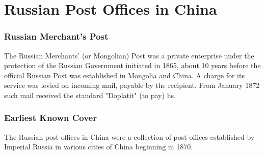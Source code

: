 \chapter{Russian Post Offices in China}  
\subsection{Russian Merchant's Post}

The Russian Merchants' (or Mongolian) Post was a private
enterprise under the protection of the Russian Government initiated
in 1865, about 10 years before the official Russian Post was established
in Mongolia and China. A charge for its service was levied on incoming mail,
payable by the recipient. From January 1872 such mail received the 
standard "Doplatit" (to pay) hs.

\subsection{Earliest Known Cover}
The Russian post offices in China were a collection of post offices 
established by Imperial Russia in various cities
of China beginning in 1870.


